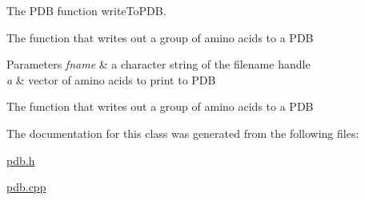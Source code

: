 The P\-D\-B function write\-To\-P\-D\-B. 

The function that writes out a group of amino acids to a P\-D\-B 
\begin{DoxyParams}{Parameters}
{\em fname} & a character string of the filename handle \\
\hline
{\em a} & vector of amino acids to print to P\-D\-B\\
\hline
\end{DoxyParams}
The function that writes out a group of amino acids to a P\-D\-B 

The documentation for this class was generated from the following files\-:\begin{DoxyCompactItemize}
\item 
\hyperlink{pdb_8h}{pdb.\-h}\item 
\hyperlink{pdb_8cpp}{pdb.\-cpp}\end{DoxyCompactItemize}
